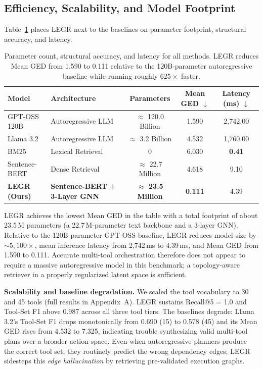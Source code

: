 \documentclass{article}
\begin{document}
\subsection{Efficiency, Scalability, and Model Footprint}
\label{sec:results-scale}
Table~\ref{tab:model_size} places LEGR next to the baselines on parameter footprint, structural accuracy, and latency.

\begin{table}[h]
\caption{Parameter count, structural accuracy, and latency for all methods. LEGR reduces Mean GED from 1.590 to 0.111 relative to the 120B-parameter autoregressive baseline while running roughly $625\times$ faster.}
\label{tab:model_size}
\centering
\small
\begin{tabular}{@{}llccc@{}}
\toprule
\textbf{Model} & \textbf{Architecture} & \textbf{Parameters} & \textbf{Mean GED $\downarrow$} & \textbf{Latency (ms) $\downarrow$} \\
\midrule
GPT-OSS 120B & Autoregressive LLM & $\approx$ 120.0 Billion & 1.590 & 2,742.00 \\
Llama 3.2    & Autoregressive LLM & $\approx$ 3.2 Billion   & 4.532 & 1,760.00 \\
\midrule
BM25         & Lexical Retrieval  & 0                       & 6.030 & \textbf{0.41} \\
Sentence-BERT       & Dense Retrieval    & $\approx$ 22.7 Million  & 4.618 & 9.10 \\
\textbf{LEGR (Ours)} & \textbf{Sentence-BERT + 3-Layer GNN} & \textbf{$\approx$ 23.5 Million} & \textbf{0.111} & 4.39 \\
\bottomrule
\end{tabular}
\end{table}

LEGR achieves the lowest Mean GED in the table with a total footprint of about 23.5\,M parameters (a 22.7\,M-parameter text backbone and a 3-layer GNN). Relative to the 120B-parameter GPT-OSS baseline, LEGR reduces model size by $\sim 5{,}100\times$, mean inference latency from 2,742\,ms to 4.39\,ms, and Mean GED from 1.590 to 0.111. Accurate multi-tool orchestration therefore does not appear to require a massive autoregressive model in this benchmark; a topology-aware retriever in a properly regularized latent space is sufficient.

\textbf{Scalability and baseline degradation.} We scaled the tool vocabulary to 30 and 45 tools (full results in Appendix~A). LEGR sustains Recall@5 = 1.0 and Tool-Set F1 above 0.987 across all three tool tiers. The baselines degrade: Llama 3.2's Tool-Set F1 drops monotonically from 0.690 (15) to 0.578 (45) and its Mean GED rises from 4.532 to 7.325, indicating trouble synthesizing valid multi-tool plans over a broader action space. Even when autoregressive planners produce the correct tool set, they routinely predict the wrong dependency edges; LEGR sidesteps this \emph{edge hallucination} by retrieving pre-validated execution graphs.
\end{document}
